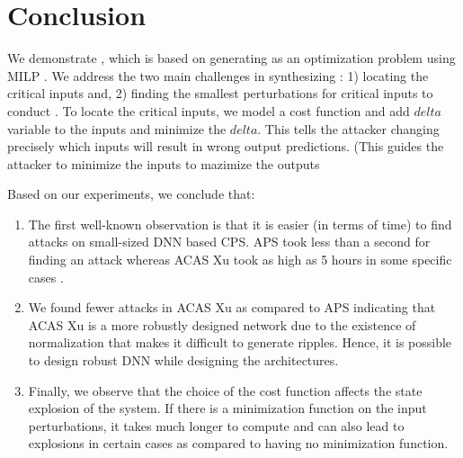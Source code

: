 \chapter{Conclusion}
\label{conclusion}
We demonstrate \tool, which is based on generating \attack as an optimization problem using MILP . We address the two main challenges in synthesizing \attack: 1) locating the critical inputs and, 2) finding the smallest perturbations for critical inputs to conduct \attack. To locate the critical inputs, we model a cost function and add $delta$ variable to the inputs and minimize the $delta$. This tells the attacker changing precisely which inputs will result in wrong output predictions. 
(This guides the attacker to minimize the inputs to mazimize the outputs 


Based on our experiments, we conclude that:

\begin{enumerate}
    \item The first well-known observation is that it is easier (in terms of time) to find attacks on small-sized DNN based CPS. APS took less than a second for finding an attack whereas ACAS Xu took as high as 5 hours in some specific cases . 

\item We found fewer attacks in ACAS Xu as compared to APS indicating  that ACAS Xu is a more robustly designed network due to the existence of normalization that makes it difficult to generate ripples. Hence, it is possible to design robust DNN while designing the architectures. 

\item Finally, we observe that the choice of the cost function affects the state explosion of the system. If there is a minimization function on the input perturbations, it takes much longer to compute and can also lead to explosions  in certain cases as compared to having no minimization function. 
\end{enumerate}






